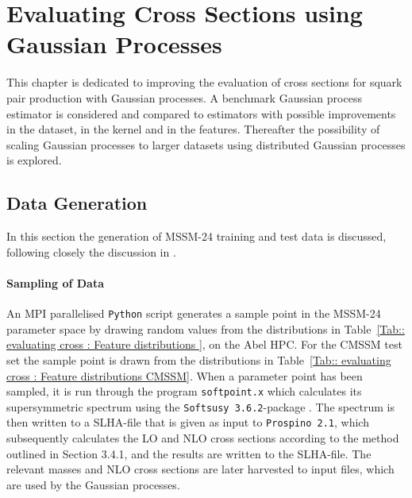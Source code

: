 \documentclass[twoside,english]{uiofysmaster}
\makeatletter
\newenvironment{chapquote}[2][2em]
  {\setlength{\@tempdima}{#1}%
   \def\chapquote@author{#2}%
   \parshape 1 \@tempdima \dimexpr\textwidth-2\@tempdima\relax%
   \itshape}
  {\par\normalfont\hfill--\ \chapquote@author\hspace*{\@tempdima}\par\bigskip}
\makeatother
\begin{document}
{{%



\chapter{Evaluating Cross Sections using Gaussian Processes}\label{Chapter:Evaluating Cross Sections using Gaussian Processes}



This chapter is dedicated to improving the evaluation of cross sections for squark pair production with Gaussian processes. A benchmark Gaussian process estimator is considered and compared to estimators with possible improvements in the dataset, in the kernel and in the features. Thereafter the possibility of scaling Gaussian processes to larger datasets using distributed Gaussian processes is explored.

\section{Data Generation}

In this section the generation of MSSM-24 training and test data is discussed, following closely the discussion in \cite{sparre2018fast}. 

\subsubsection{Sampling of Data}

An MPI parallelised \verb|Python| script generates a sample point in the MSSM-24 parameter space by drawing random values from the distributions in Table~\ref{Tab:: evaluating cross : Feature distributions }, on the Abel HPC. For the CMSSM test set the sample point is drawn from the distributions in Table~\ref{Tab:: evaluating cross : Feature distributions CMSSM}. When a parameter point has been sampled, it is run through the program \verb|softpoint.x| which calculates its supersymmetric spectrum using the \verb|Softsusy 3.6.2|-package \cite{Allanach:2001kg}. The spectrum is then written to a SLHA-file \cite{Skands:2003cj} that is given as input to \verb|Prospino 2.1|, which subsequently calculates the LO and NLO cross sections according to the method outlined in Section 3.4.1, and the results are written to the SLHA-file. The relevant masses and NLO cross sections are later harvested to input files, which are used by the Gaussian processes. 

}}
\end{document}
